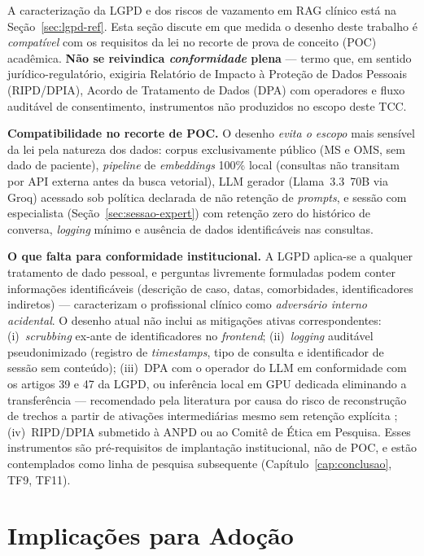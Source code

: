 \documentclass[
  12pt,
  oneside,
  a4paper,
  english,
  brazil
]{abntex2}
\begin{document}
A caracterização da LGPD e dos riscos de vazamento em RAG clínico está
na Seção~\ref{sec:lgpd-ref}. Esta seção discute em que medida o desenho
deste trabalho é \emph{compatível} com os requisitos da lei no recorte
de prova de conceito (POC) acadêmica. \textbf{Não se reivindica
\emph{conformidade} plena} --- termo que, em sentido jurídico-regulatório,
exigiria Relatório de Impacto à Proteção de Dados Pessoais (RIPD/DPIA),
Acordo de Tratamento de Dados (DPA) com operadores e fluxo auditável de
consentimento, instrumentos não produzidos no escopo deste TCC.

\textbf{Compatibilidade no recorte de POC.} O desenho \emph{evita o
escopo} mais sensível da lei pela natureza dos dados: corpus
exclusivamente público (MS e OMS, sem dado de paciente), \textit{pipeline}
de \emph{embeddings} 100\% local (consultas não transitam por API
externa antes da busca vetorial), LLM gerador (Llama~3.3~70B via Groq)
acessado sob política declarada de não retenção de \emph{prompts}, e
sessão com especialista (Seção~\ref{sec:sessao-expert}) com retenção
zero do histórico de conversa, \textit{logging} mínimo e ausência de
dados identificáveis nas consultas.

\textbf{O que falta para conformidade institucional.} A LGPD aplica-se
a qualquer tratamento de dado pessoal, e perguntas livremente
formuladas podem conter informações identificáveis (descrição de caso,
datas, comorbidades, identificadores indiretos) ---
\citeauthor{privacyRAGHealthcare2025}
\cite{privacyRAGHealthcare2025} caracterizam o profissional clínico
como \emph{adversário interno acidental}. O desenho atual não inclui
as mitigações ativas correspondentes: (i)~\textit{scrubbing} ex-ante
de identificadores no \textit{frontend}; (ii)~\textit{logging}
auditável pseudonimizado (registro de \emph{timestamps}, tipo de
consulta e identificador de sessão sem conteúdo); (iii)~DPA com o
operador do LLM em conformidade com os artigos 39 e 47 da LGPD, ou
inferência local em GPU dedicada eliminando a transferência ---
recomendado pela literatura por causa do risco de reconstrução de
trechos a partir de ativações intermediárias mesmo sem retenção
explícita \cite{privacyRAGHealthcare2025, sokPrivacyLLM2026};
(iv)~RIPD/DPIA submetido à ANPD ou ao Comitê de Ética em Pesquisa.
Esses instrumentos são pré-requisitos de implantação institucional,
não de POC, e estão contemplados como linha de pesquisa subsequente
(Capítulo~\ref{cap:conclusao}, TF9, TF11).

\section{Implicações para Adoção}
\end{document}
